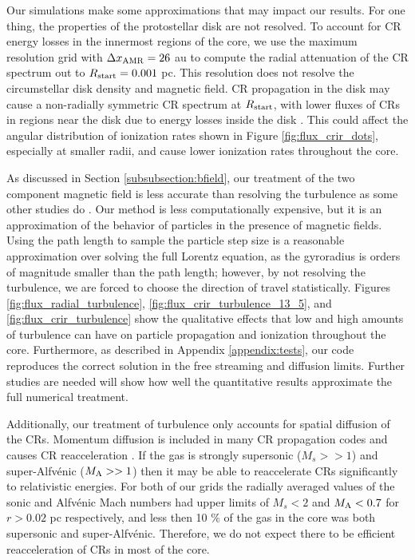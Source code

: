 \documentclass[twocolumn]{aastex63}
\begin{document}
Our simulations make some approximations that may impact our results. For one thing, the properties of the protostellar disk are not resolved. To account for CR energy losses in the innermost regions of the core, we use the maximum resolution grid with $\Delta x_{\rm AMR}=26$ au to compute the radial attenuation of the CR spectrum out to $R_{\rm start}=0.001$ pc. This resolution does not resolve the circumstellar disk density and magnetic field. CR propagation in the disk may cause a non-radially symmetric CR spectrum at $R_{\rm start}$, with lower fluxes of CRs in regions near the disk due to energy losses inside the disk \citep{offner_2019_disks}. This could affect the angular distribution of ionization rates shown in Figure \ref{fig:flux_crir_dots}, especially at smaller radii, and cause lower ionization rates throughout the core.

As discussed in Section \ref{subsubsection:bfield}, our treatment of the two component magnetic field is less accurate than resolving the turbulence as some other studies do \citep[e.g.,][]{giacolone_1999_turbulence, fraschetti_2018_mottled}. Our method is less computationally expensive, but it is an approximation  of the behavior of particles in the presence of magnetic fields. Using the path length to sample the particle step size is a reasonable approximation over solving the full Lorentz equation, as the gyroradius is orders of magnitude smaller than the path length; however, by not resolving the turbulence, we are forced to choose the direction of travel statistically. Figures \ref{fig:flux_radial_turbulence}, \ref{fig:flux_crir_turbulence_13_5}, and \ref{fig:flux_crir_turbulence} show the qualitative effects that low and high amounts of turbulence can have on particle propagation and ionization throughout the core. Furthermore, as described in Appendix \ref{appendix:tests}, our code reproduces the correct solution in the free streaming and diffusion limits. Further studies are needed will show how well the quantitative results approximate the full numerical treatment. 

Additionally, our treatment of turbulence only accounts for spatial diffusion of the CRs. Momentum diffusion is included in many CR propagation codes and causes CR reacceleration \citep{strong_1998_galprop}. If the gas is strongly supersonic ($M_s>>1$) and super-Alfv\'enic ($M_{\rm A}>>1$) then it may be able to reaccelerate CRs significantly to relativistic energies. For both of our grids the radially averaged values of the sonic and Alfv\'enic Mach numbers had upper limits of $M_s<2$ and $M_{\rm A}<0.7$ for $r>0.02$ pc respectively, and less then 10 $\%$ of the gas in the core was both supersonic and super-Alfv\'enic. Therefore, we do not expect there to be efficient reacceleration of CRs in most of the core.
\end{document}
